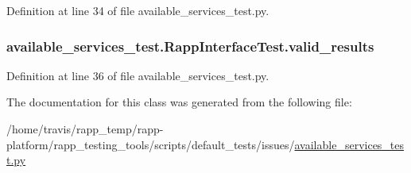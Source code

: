 Definition at line 34 of file available\-\_\-services\-\_\-test.\-py.

\hypertarget{classavailable__services__test_1_1RappInterfaceTest_a7d46f89a829e4ab01e82a21b905b4e91}{
\subsubsection[{valid\-\_\-results}]{\setlength{\rightskip}{0pt plus 5cm}available\-\_\-services\-\_\-test.\-Rapp\-Interface\-Test.\-valid\-\_\-results}}\label{classavailable__services__test_1_1RappInterfaceTest_a7d46f89a829e4ab01e82a21b905b4e91}


Definition at line 36 of file available\-\_\-services\-\_\-test.\-py.



The documentation for this class was generated from the following file\-:\begin{DoxyCompactItemize}
\item 
/home/travis/rapp\-\_\-temp/rapp-\/platform/rapp\-\_\-testing\-\_\-tools/scripts/default\-\_\-tests/issues/\hyperlink{available__services__test_8py}{available\-\_\-services\-\_\-test.\-py}\end{DoxyCompactItemize}
